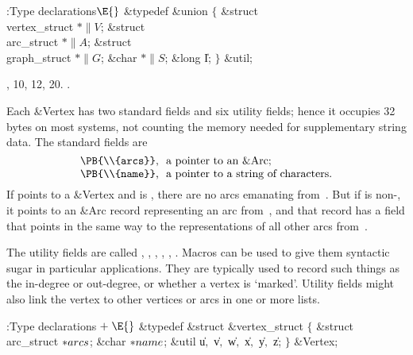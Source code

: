 \Y\B\4:Type declarations\X${}\E{}$\6
\&{typedef} \&{union} ${}\{{}$\1\6
\&{struct} \\{vertex\_struct} ${}{*}\|V{}$;\6
\&{struct} \\{arc\_struct} ${}{*}\|A{}$;\6
\&{struct} \\{graph\_struct} ${}{*}\|G{}$;\6
\&{char} ${}{*}\|S{}$;\6
\&{long} \|I;\2\6
${}\}{}$ \&{util};\par
{}, 10, 12, 20.
.\fi

Each \&{Vertex} has two standard fields and six utility fields; hence it
occupies 32 bytes on most systems, not counting the memory needed for
supplementary string data. The standard fields are
$$\vcenter{\halign{#,\ \ \hfil&#\hfil\cr
\PB{\\{arcs}}&a pointer to an \&{Arc};\cr
\PB{\\{name}}&a pointer to a string of characters.\cr}}$$
If  points to a \&{Vertex} and  is \PB{$\NULL$},
there are no arcs
emanating from~. But if  is non-\PB{$\NULL$}, it
points to an \&{Arc}
record representing an arc from~, and that record has a 
field that
points in the same way to the representations of all other arcs from~.

The utility fields are called , , , , ,
. Macros can
be used to give them syntactic sugar in particular applications. They are
typically used to record such things as the in-degree or out-degree, or
whether a vertex is `marked'. Utility fields might also link the vertex
to other vertices or arcs in one or more lists.

\Y\B\4:Type declarations\X${}\mathrel+\E{}$\6
\&{typedef} \&{struct} \&{vertex\_struct} ${}\{{}$\1\6
\&{struct} \\{arc\_struct} ${}{*}\\{arcs}{}$;\6
\&{char} ${}{*}\\{name}{}$;\6
\&{util} \|u${},{}$ \|v${},{}$ \|w${},{}$ \|x${},{}$ \|y${},{}$ \|z;\2\6
${}\}{}$ \&{Vertex};\par
\fi

